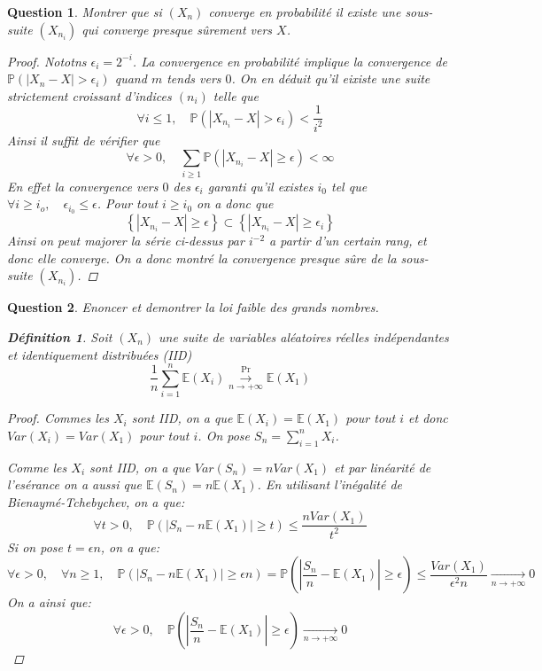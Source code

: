 \documentclass{article}
\theoremstyle{plain}
\newtheorem{question}{Question}
\theoremstyle{definition}
\newtheorem{definition}{Définition}
\begin{document}
\begin{question}
	Montrer que si $(X_n)$ converge en probabilité il existe une sous-suite $(X_{n_i})$ qui converge presque sûrement vers $X$.
	\begin{proof}
		Nototns $\epsilon_i = 2^{-i}$. La convergence en probabilité implique la convergence de $\mathbb{P} (|X_n - X| > \epsilon_i)$ quand $m$ tends vers $0$.
		On en déduit qu'il eixiste une suite strictement croissant d'indices $(n_i)$ telle que
		$$\forall i \leq 1, \quad \mathbb{P} (|X_{n_i} - X| > \epsilon_i) < \frac{1}{i^2}$$
		Ainsi il suffit de vérifier que
		$$\forall \epsilon > 0, \quad \sum_{i \geq 1} \mathbb{P} (|X_{n_i} - X| \geq \epsilon) < \infty$$
		En effet la convergence vers $0$ des $\epsilon_i$ garanti qu'il existes $i_0$ tel que $\forall i \geq i_o, \quad
			\epsilon_{i_0} \leq \epsilon$. Pour tout $i \geq i_0$ on a donc que
		$$ \left\{|X_{n_i} - X| \geq \epsilon \right\} \subset \left\{|X_{n_i} - X| \geq \epsilon_{i} \right\}$$
		Ainsi on peut majorer la série ci-dessus par $i^{-2}$ a partir d'un certain rang, et donc elle converge.
		On a donc montré la convergence presque sûre de la sous-suite $(X_{n_i})$.
	\end{proof}
\end{question}


\begin{question}
	Enoncer et demontrer la loi faible des grands nombres.
	\begin{definition}
		Soit $(X_n)$ une suite de variables aléatoires réelles indépendantes et identiquement distribuées (IID)
		\begin{equation}
			\frac{1}{n}\sum_{i=1}^n \mathbb{E} (X_i) \overset{\Pr}{\underset{n\to +\infty}{\longrightarrow}} \mathbb{E} (X_1)
		\end{equation}
		\begin{proof}

			Commes les $X_i$ sont IID, on a que $\mathbb{E} (X_i) = \mathbb{E} (X_1)$ pour tout $i$ et donc
			$Var(X_i) = Var(X_1)$ pour tout $i$. On pose $S_n = \sum_{i=1}^n X_i$.

			Comme les $X_i$ sont IID, on a que $Var(S_n) = nVar(X_1)$ et par linéarité de l'esérance on a aussi que
			$\mathbb{E} (S_n) = n\mathbb{E} (X_1)$. En utilisant l'inégalité de Bienaymé-Tchebychev, on a que:
			\begin{equation*}
				\forall t > 0, \quad \mathbb{P} (|S_n - n\mathbb{E} (X_1)| \geq t) \leq \frac{nVar(X_1)}{t^2}
			\end{equation*}
			Si on pose $t = \epsilon n$, on a que:
			\begin{equation*}
				\forall \epsilon > 0, \quad \forall n \geq 1, \quad \mathbb{P} \left(|S_n - n\mathbb{E} (X_1)| \geq \epsilon n\right) =
				\mathbb{P} \left(|\frac{S_n}{n} - \mathbb{E} (X_1)| \geq \epsilon\right) \leq \frac{Var(X_1)}{\epsilon^2 n} \underset{n\to +\infty}{\longrightarrow} 0
			\end{equation*}
			On a ainsi que:
			$$ \forall \epsilon > 0,\quad \mathbb{P} \left(|\frac{S_n}{n} - \mathbb{E} (X_1)| \geq \epsilon\right) \underset{n\to +\infty}{\longrightarrow} 0$$
		\end{proof}
	\end{definition}
\end{question}
\end{document}
